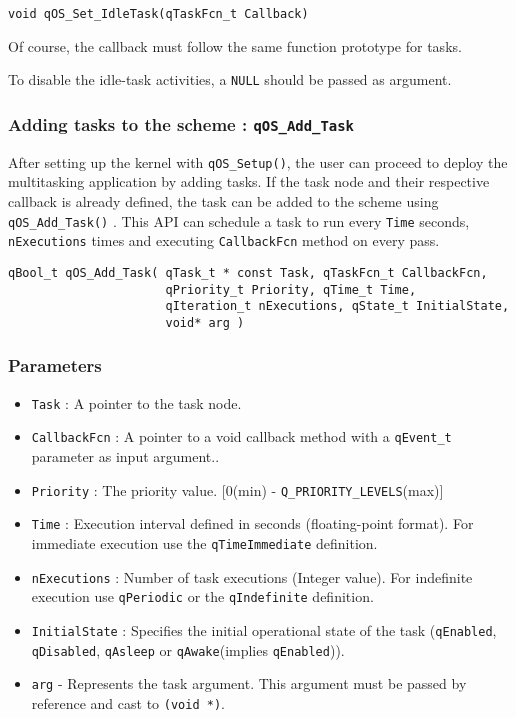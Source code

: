 \begin{lstlisting}[style=CStyle]
void qOS_Set_IdleTask(qTaskFcn_t Callback)
\end{lstlisting}

Of course, the callback must follow the same function prototype for tasks.
\medskip

\begin{tcolorbox}
\HandRight To disable the idle-task activities, a \lstinline{NULL} should be passed as argument.
\end{tcolorbox}

\subsubsection{Adding tasks to the scheme : \lstinline{qOS_Add_Task} } \label{addtask}
After setting up the kernel with \lstinline{qOS_Setup()}, the user can proceed to deploy the multitasking application by adding tasks. If the task node and their respective callback is already defined, the task can be added to the scheme using \lstinline{qOS_Add_Task()} . This API can schedule a task to run every \lstinline{Time} seconds, \lstinline{nExecutions} times and executing \lstinline{CallbackFcn} method on every pass.
\medskip

\begin{lstlisting}[style=CStyle]
qBool_t qOS_Add_Task( qTask_t * const Task, qTaskFcn_t CallbackFcn, 
                      qPriority_t Priority, qTime_t Time, 
                      qIteration_t nExecutions, qState_t InitialState, 
                      void* arg )
\end{lstlisting}

\subsubsection*{Parameters}
\begin{itemize}
    \item \lstinline{Task} : A pointer to the task node. 
    \item \lstinline{CallbackFcn} : A pointer to a void callback method with a \lstinline{qEvent_t} parameter as input argument..
    \item \lstinline{Priority} : The priority value. [0(min) - \lstinline{Q_PRIORITY_LEVELS}(max)]
    \item \lstinline{Time} : Execution interval defined in seconds (floating-point format). For immediate execution use the  \lstinline{qTimeImmediate} definition. 
    \item \lstinline{nExecutions} : Number of task executions (Integer value). For indefinite execution  use \lstinline{qPeriodic} or the \lstinline{qIndefinite} definition. 
    \item \lstinline{InitialState} : Specifies the initial operational state of the task (\lstinline{qEnabled}, \lstinline{qDisabled}, \lstinline{qAsleep} or \lstinline{qAwake}(implies \lstinline{qEnabled})).
    \item \lstinline{arg} - Represents the task argument. This argument must be passed by reference and cast to \lstinline{(void *)}. 
\end{itemize}

